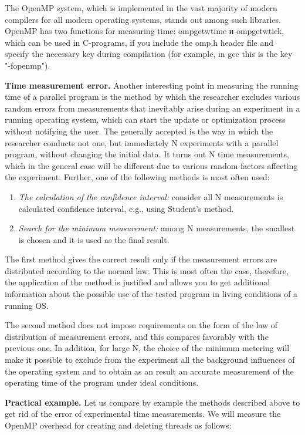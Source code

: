 {	\par The OpenMP system, which is implemented in the vast majority of modern compilers for all modern operating systems, stands out among such libraries. OpenMP has two functions for measuring time: omp\textunderscore get\textunderscore wtime и omp\textunderscore get\textunderscore wtick, which can be used in C-programs, if you include the omp.h header file and specify the necessary key during compilation (for example, in gcc this is the key "{}-fopenmp").
	\par\textbf{Time measurement error.} Another interesting point in measuring the running time of a parallel program is the method by which the researcher excludes various random errors from measurements that inevitably arise during an experiment in a running operating system, which can start the update or optimization process without notifying the user. The generally accepted is the way in which the researcher conducts not one, but immediately N experiments with a parallel program, without changing the initial data. It turns out N time measurements, which in the general case will be different due to various random factors affecting the experiment. Further, one of the following methods is most often used:
	\begin{enumerate}
		\item\textit{The calculation of the confidence interval:} consider all N measurements is calculated confidence interval, e.g., using Student's method.
		\item\textit{Search for the minimum measurement:} among N measurements, the smallest is chosen and it is used as the final result.
	\end{enumerate}
	\par The first method gives the correct result only if the measurement errors are distributed according to the normal law. This is most often the case, therefore, the application of the method is justified and allows you to get additional information about the possible use of the tested program in living conditions of a running OS.
	\par The second method does not impose requirements on the form of the law of distribution of measurement errors, and this compares favorably with the previous one. In addition, for large N, the choice of the minimum metering will make it possible to exclude from the experiment all the background influences of the operating system and to obtain as an result an accurate measurement of the operating time of the program under ideal conditions.
	\par\textbf{Practical example.} Let us compare by example the methods described above to get rid of the error of experimental time measurements. We will measure the OpenMP overhead for creating and deleting threads as follows:
}
